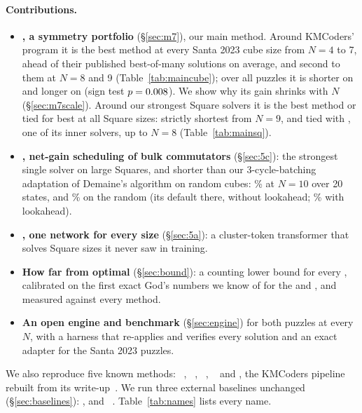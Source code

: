 \paragraph{Contributions.}
\begin{itemize}
\item \textbf{\Mseven, a symmetry portfolio} (\S\ref{sec:m7}), our main method. Around KMCoders' program it is the best
  method at every Santa 2023 cube size from $N=4$ to 7, ahead of their published best-of-many solutions on average,
  and second to them at $N=8$ and 9 (Table~\ref{tab:maincube}); over all \MsevenAllPuzzles{} puzzles it is shorter on
  \MsevenAllWins{} and longer on \MsevenAllLosses{} (sign test $p=0.008$). We show why its gain shrinks with $N$
  (\S\ref{sec:m7scale}). Around our strongest Square solvers it is the best method or tied for best at all \SizesSquare{}
  Square sizes: strictly shortest from $N=9$, and tied with \Mfour, one of its inner solvers, up to $N=8$
  (Table~\ref{tab:mainsq}).
\item \textbf{\FiveC, net-gain scheduling of bulk commutators} (\S\ref{sec:5c}): the strongest single solver on large
  Squares, and shorter than our 3-cycle-batching adaptation of Demaine's algorithm on random cubes: \FiveCCiGainTen\% at $N=10$
  over 20 states, and \FiveCGainTwenty\% on the random  (its default there, without lookahead;
  \FiveCLookaheadGainTwenty\% with lookahead).
\item \textbf{\FiveA, one network for every size} (\S\ref{sec:5a}): a cluster-token transformer that solves Square
  sizes it never saw in training.
\item \textbf{How far from optimal} (\S\ref{sec:bound}): a counting lower bound for every , calibrated on the
  first exact God's numbers we know of for the  and , and measured against every method.
\item \textbf{An open engine and benchmark} (\S\ref{sec:engine}) for both puzzles at every $N$, with a harness that
  re-applies and verifies every solution and an exact adapter for the Santa 2023 puzzles.
\end{itemize}
We also reproduce five known methods: \Mone~\cite{korf1997optimal}, \Mtwo~\cite{kociemba2phase},
\Mthree~\cite{demaine2011algorithms}, \Mfour~\cite{chervov2025cayleypy} and \Msix, the KMCoders pipeline rebuilt from its
write-up~\cite{kmcoders2024santa}. We run three external baselines unchanged (\S\ref{sec:baselines}): \Bone, \Btwo and
\Bthree~\cite{walton2017nxnxn}. Table~\ref{tab:names} lists every name.

